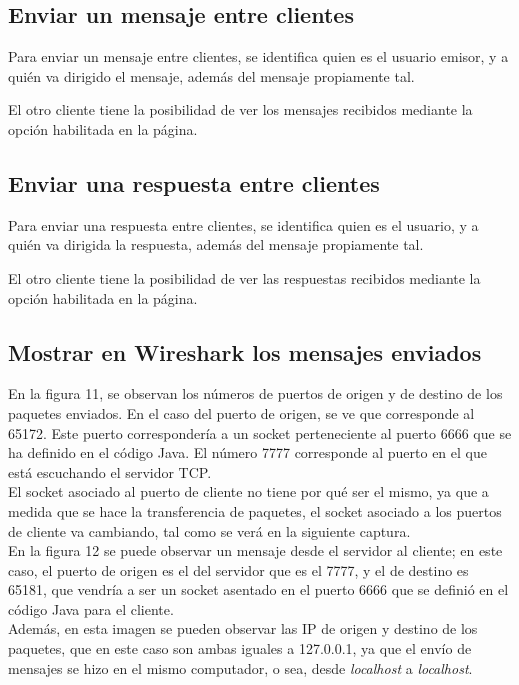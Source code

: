 \documentclass[12pt]{article}
\begin{document}
\subsection{Enviar un mensaje entre clientes}

Para enviar un mensaje entre clientes, se identifica quien es el usuario emisor, y a quién va dirigido el mensaje, además del mensaje propiamente tal.

El otro cliente tiene la posibilidad de ver los mensajes recibidos mediante la opción habilitada en la página.

\subsection{Enviar una respuesta entre clientes}

Para enviar una respuesta entre clientes, se identifica quien es el usuario, y a quién va dirigida la respuesta, además del mensaje propiamente tal.

El otro cliente tiene la posibilidad de ver las respuestas recibidos mediante la opción habilitada en la página.\\

\subsection{Mostrar en Wireshark los mensajes enviados}
En la figura 11, se observan los números de puertos de origen y de destino de los paquetes enviados. En el caso del puerto de origen, se ve que corresponde al 65172. Este puerto correspondería a un socket perteneciente al puerto 6666 que se ha definido en el código Java. El número 7777 corresponde al puerto en el que está escuchando el servidor TCP.\\

El socket asociado al puerto de cliente no tiene por qué ser el mismo, ya que a medida que se hace la transferencia de paquetes, el socket asociado a los puertos de cliente va cambiando, tal como se verá en la siguiente captura.\\

En la figura 12 se puede observar un mensaje desde el servidor al cliente; en este caso, el puerto de origen es el del servidor que es el 7777, y el de destino es 65181, que vendría a ser un socket asentado en el puerto 6666 que se definió en el código Java para el cliente.\\

Además, en esta imagen se pueden observar las IP de origen y destino de los paquetes, que en este caso son ambas iguales a 127.0.0.1, ya que el envío de mensajes se hizo en el mismo computador, o sea, desde \emph{localhost} a \emph{localhost}.
\end{document}
